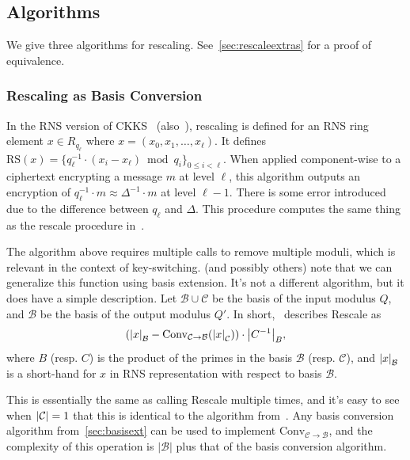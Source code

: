 \documentclass[../../fheimpl.tex]{subfiles}
\begin{document}
\subsection{Algorithms}
\label{sec:rescale-algs}
We give three algorithms for rescaling. See~\cref{sec:rescaleextras} for a proof of equivalence.

\subsubsection{Rescaling as Basis Conversion}
In the RNS version of CKKS~\cite{cryptoeprint:2018/931} (also~\cite{cryptoeprint:2019/688, cryptoeprint:2016/510}), rescaling is defined for an RNS ring element $x\in R_{q_\ell}$ where $x=(x_0, x_1, \ldots, x_\ell)$. It defines $\mathrm{RS}(x) = \{q_\ell^{-1}\cdot (x_i-x_\ell)\bmod q_i\}_{0\le i<\ell}$. When applied component-wise to a ciphertext encrypting a message $m$ at level $\ell$, this algorithm outputs an encryption of $q_\ell^{-1}\cdot m\approx \Delta^{-1}\cdot m$ at level $\ell-1$. There is some error introduced due to the difference between $q_\ell$ and $\Delta$. This procedure computes the same thing as the rescale procedure in~\cite{cryptoeprint:2016/421}.

The algorithm above requires multiple calls to remove multiple moduli, which is relevant in the context of key-switching. \cite{cryptoeprint:2019/688} (and possibly others) note that we can generalize this function using basis extension. It's not a different algorithm, but it does have a simple description. Let $\mathcal{B}\cup\mathcal{C}$ be the basis of the input modulus $Q$, and $\mathcal{B}$ be the basis of the output modulus $Q'$. 
In short,~\cite{cryptoeprint:2019/688} describes \textrm{Rescale} as
\[(\abs*{x}_\mathcal{B} - \mathrm{Conv}_{\mathcal{C}\rightarrow\mathcal{B}}(\abs*{x}_\mathcal{C}))\cdot \abs*{C^{-1}}_B,\]
where $B$ (resp. $C$) is the product of the primes in the basis $\mathcal{B}$ (resp. $\mathcal{C}$), and $\abs*{x}_\mathcal{B}$ is a short-hand for $x$ in RNS representation with respect to basis $\mathcal{B}$.

This is essentially the same as calling \textrm{Rescale} multiple times, and it's easy to see when $\abs{\mathcal{C}}=1$ that this is identical to the algorithm from~\cite{cryptoeprint:2018/931}. Any basis conversion algorithm from~\cref{sec:basisext} can be used to implement $\mathrm{Conv}_{\mathcal{C}\rightarrow\mathcal{B}}$, and the complexity of this operation is $|\mathcal{B}|$ plus that of the basis conversion algorithm.
\end{document}
